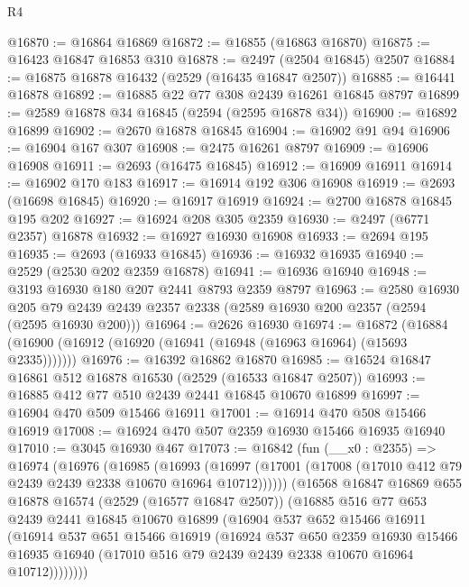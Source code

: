 \begin{lexlean}{R4}
\begin{coremodule}
@16870 := @16864 @16869
@16872 := @16855 (@16863 @16870)
@16875 := @16423 @16847 @16853 @310
@16878 := @2497 (@2504 @16845) @2507
@16884 := @16875 @16878 @16432 (@2529 (@16435 @16847 @2507))
@16885 := @16441 @16878
@16892 := @16885 @22 @77 @308 @2439 @16261 @16845 @8797
@16899 := @2589 @16878 @34 @16845 (@2594 (@2595 @16878 @34))
@16900 := @16892 @16899
@16902 := @2670 @16878 @16845
@16904 := @16902 @91 @94
@16906 := @16904 @167 @307
@16908 := @2475 @16261 @8797
@16909 := @16906 @16908
@16911 := @2693 (@16475 @16845)
@16912 := @16909 @16911
@16914 := @16902 @170 @183
@16917 := @16914 @192 @306 @16908
@16919 := @2693 (@16698 @16845)
@16920 := @16917 @16919
@16924 := @2700 @16878 @16845 @195 @202
@16927 := @16924 @208 @305 @2359
@16930 := @2497 (@6771 @2357) @16878
@16932 := @16927 @16930 @16908
@16933 := @2694 @195
@16935 := @2693 (@16933 @16845)
@16936 := @16932 @16935
@16940 := @2529 (@2530 @202 @2359 @16878)
@16941 := @16936 @16940
@16948 := @3193 @16930 @180 @207 @2441 @8793 @2359 @8797
@16963 := @2580
    @16930
    @205
    @79
    @2439
    @2439
    @2357
    @2338
    (@2589 @16930 @200 @2357 (@2594 (@2595 @16930 @200)))
@16964 := @2626 @16930
@16974 := @16872
    (@16884 (@16900 (@16912 (@16920 (@16941 (@16948 (@16963 @16964) (@15693 @2335)))))))
@16976 := @16392 @16862 @16870
@16985 := @16524 @16847 @16861 @512 @16878 @16530 (@2529 (@16533 @16847 @2507))
@16993 := @16885 @412 @77 @510 @2439 @2441 @16845 @10670 @16899
@16997 := @16904 @470 @509 @15466 @16911
@17001 := @16914 @470 @508 @15466 @16919
@17008 := @16924 @470 @507 @2359 @16930 @15466 @16935 @16940
@17010 := @3045 @16930 @467
@17073 := @16842
    (fun (__x0 : @2355) =>
    @16974
      (@16976
        (@16985
          (@16993
            (@16997 (@17001 (@17008 (@17010 @412 @79 @2439 @2439 @2338 @10670 @16964 @10712))))))
        (@16568
          @16847
          @16869
          @655
          @16878
          @16574
          (@2529 (@16577 @16847 @2507))
          (@16885
            @516
            @77
            @653
            @2439
            @2441
            @16845
            @10670
            @16899
            (@16904
              @537
              @652
              @15466
              @16911
              (@16914
                @537
                @651
                @15466
                @16919
                (@16924
                  @537
                  @650
                  @2359
                  @16930
                  @15466
                  @16935
                  @16940
                  (@17010 @516 @79 @2439 @2439 @2338 @10670 @16964 @10712))))))))

\end{coremodule}
\end{lexlean}
